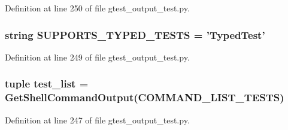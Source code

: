 \-Definition at line 250 of file gtest\-\_\-output\-\_\-test.\-py.

\hypertarget{namespacegtest__output__test_a6afa6549700ee5662a4c4b358ea34efa}{
\subsubsection[{\-S\-U\-P\-P\-O\-R\-T\-S\-\_\-\-T\-Y\-P\-E\-D\-\_\-\-T\-E\-S\-T\-S}]{\setlength{\rightskip}{0pt plus 5cm}string {\bf \-S\-U\-P\-P\-O\-R\-T\-S\-\_\-\-T\-Y\-P\-E\-D\-\_\-\-T\-E\-S\-T\-S} = '{\bf \-Typed\-Test}'}}\label{d6/dc2/namespacegtest__output__test_a6afa6549700ee5662a4c4b358ea34efa}


\-Definition at line 249 of file gtest\-\_\-output\-\_\-test.\-py.

\hypertarget{namespacegtest__output__test_a7f9b464ccfd6a25be5d881c09fad1bf0}{
\subsubsection[{test\-\_\-list}]{\setlength{\rightskip}{0pt plus 5cm}tuple {\bf test\-\_\-list} = {\bf \-Get\-Shell\-Command\-Output}({\bf \-C\-O\-M\-M\-A\-N\-D\-\_\-\-L\-I\-S\-T\-\_\-\-T\-E\-S\-T\-S})}}\label{d6/dc2/namespacegtest__output__test_a7f9b464ccfd6a25be5d881c09fad1bf0}


\-Definition at line 247 of file gtest\-\_\-output\-\_\-test.\-py.

